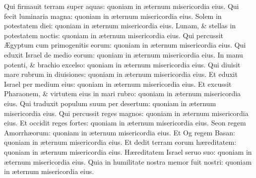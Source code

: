 \documentclass[a5paper,10pt]{book}
\def\ae{æ}
\def\AE{Æ}
\begin{document}
\begin{multicols*}{2}
\newline \color{red} Q\color{black}ui firmauit terram super aquas: quoniam in \ae ternum misericordia eius.
\newline \color{red} Q\color{black}ui fecit luminaria magna: quoniam in \ae ternum misericordia eius.
\newline \color{red} S\color{black}olem in potestatem diei: quoniam in \ae ternum misericordia eius.
\newline \color{red} L\color{black}unam, \& stellas in potestatem noctis: quoniam in \ae ternum misericordia eius.
\newline \color{red} Q\color{black}ui percussit \AE gyptum cum primogenitis eorum: quoniam in \ae ternum misericordia eius.
\newline \color{red} Q\color{black}ui eduxit Israel de medio eorum: quoniam in \ae ternum misericordia eius.
\newline \color{red} I\color{black}n manu potenti, \& brachio excelso: quoniam in \ae ternum misericordia eius.
\newline \color{red} Q\color{black}ui diuisit mare rubrum in diuisiones: quoniam in \ae ternum misericordia eius.
\newline \color{red} E\color{black}t eduxit Israel per medium eius: quoniam in \ae ternum misericordia eius.
\newline \color{red} E\color{black}t excussit Pharaonem, \& virtutem eius in mari rubro: quoniam in \ae ternum misericordia eius.
\newline \color{red} Q\color{black}ui traduxit populum suum per desertum: quoniam in \ae ternum misericordia eius.
\newline \color{red} Q\color{black}ui percussit reges magnos: quoniam in \ae ternum misericordia eius.
\newline \color{red} E\color{black}t occidit reges fortes: quoniam in \ae ternum misericordia eius.
\newline \color{red} S\color{black}eon regem Amorrh\ae orum: quoniam in \ae ternum misericordia eius.
\newline \color{red} E\color{black}t Og regem Basan: quoniam in \ae ternum misericordia eius.
\newline \color{red} E\color{black}t dedit terram eorum h\ae reditatem: quoniam in \ae ternum misericordia eius.
\newline \color{red} H\color{black}\ae reditatem Israel seruo suo: quoniam in \ae ternum misericordia eius.
\newline \color{red} Q\color{black}uia in humilitate nostra memor fuit nostri: quoniam in \ae ternum misericordia eius.

\end{multicols*}
\end{document}
